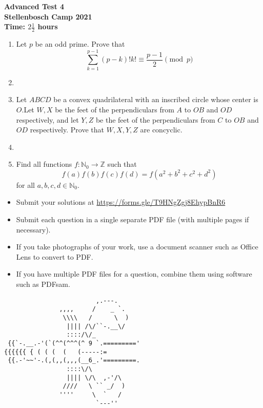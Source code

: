 \documentclass{article}
\begin{document}
\thispagestyle{empty}

\begin{center}
  \textbf{\Large Advanced Test 4}
  \\ \vspace{1em}
  \textbf{\large Stellenbosch Camp 2021}
  \\ \vspace{1em}
  \textbf{\large Time: $2\frac{1}{2}$ hours}
\end{center}

\bigskip

\begin{enumerate}[itemsep=\fill]

\item %
Let $p$ be an odd prime. Prove that
\[
	\sum_{k=1}^{p-1} (p-k)!k! \equiv \frac{p-1}{2} \pmod{p}
\]


\item %


\item %
Let $ABCD$ be a convex quadrilateral with an inscribed circle whose center is $O$.Let $W,X$ be the feet of the perpendiculars from $A$ to $OB$ and $OD$ respectively, and let $Y,Z$ be the feet of the perpendiculars from $C$ to $OB$ and $OD$ respectively. Prove that $W,X,Y,Z$ are concyclic. 


\item %


\item %
Find all functions $f : \mathbb{N}_0 \to \mathbb{Z}$ such that
\[
  f(a) f(b) f(c) f(d) = f\left(a^2 + b^2 + c^2 + d^2\right)
\]
for all $a, b, c, d \in \mathbb{N}_0$.

\end{enumerate}


\vfill
\begin{itemize}
	\item Submit your solutions at \href{https://forms.gle/T9HNgZgj8EhypBnR6}{https://forms.gle/T9HNgZgj8EhypBnR6}
	\item Submit each question in a single separate PDF file (with multiple pages if necessary).
	\item If you take photographs of your work, use a document scanner such as Office Lens to convert to PDF.
	\item If you have multiple PDF files for a question, combine them using software such as PDFsam.
\end{itemize}

\vfill
\centering
\small
\begin{BVerbatim}
                         ,.---.   
               ,,,,     /    _ `.
                \\\\   /      \  )
                 |||| /\/``-.__\/
                 ::::/\/_
 {{`-.__.-'(`(^^(^^^(^ 9 `.========='
{{{{{{ { ( ( (  (   (-----:=
 {{.-'~~'-.(,(,,(,,,(__6_.'=========.
                 ::::\/\ 
                 |||| \/\  ,-'/\
                ////   \ `` _/  )
               ''''     \  `   /
                         `---''
\end{BVerbatim}
\end{document}
